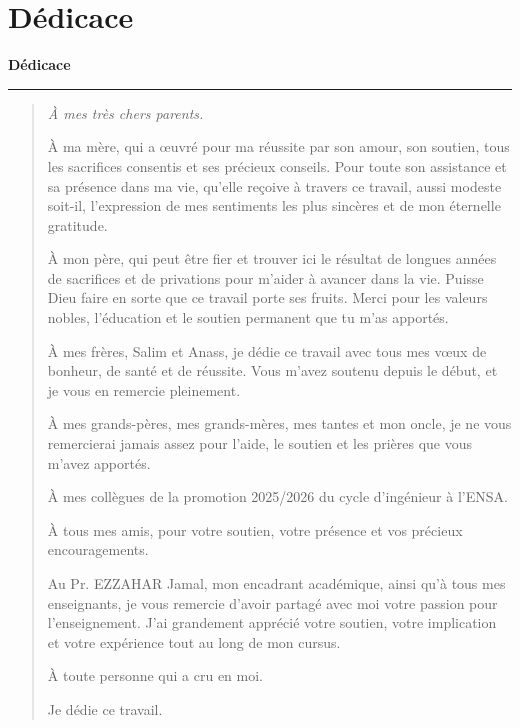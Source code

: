 \chapter*{Dédicace}

\begin{center}
\vspace*{0.5cm}
{\Large\bfseries Dédicace}\\[0.25cm]
{\color{softline}\rule{0.38\textwidth}{0.7pt}}
\end{center}

\vspace{0.35cm}

\begin{quote}
\small
\itshape
\setlength{\parskip}{0.42em}
\setlength{\baselineskip}{1.12\baselineskip}
À mes très chers parents.

À ma mère, qui a œuvré pour ma réussite par son amour, son soutien, tous les sacrifices consentis et ses précieux conseils. Pour toute son assistance et sa présence dans ma vie, qu'elle reçoive à travers ce travail, aussi modeste soit-il, l'expression de mes sentiments les plus sincères et de mon éternelle gratitude.

À mon père, qui peut être fier et trouver ici le résultat de longues années de sacrifices et de privations pour m'aider à avancer dans la vie. Puisse Dieu faire en sorte que ce travail porte ses fruits. Merci pour les valeurs nobles, l'éducation et le soutien permanent que tu m'as apportés.

À mes frères, Salim et Anass, je dédie ce travail avec tous mes vœux de bonheur, de santé et de réussite. Vous m'avez soutenu depuis le début, et je vous en remercie pleinement.

À mes grands-pères, mes grands-mères, mes tantes et mon oncle, je ne vous remercierai jamais assez pour l'aide, le soutien et les prières que vous m'avez apportés.

À mes collègues de la promotion 2025/2026 du cycle d'ingénieur à l'ENSA.

À tous mes amis, pour votre soutien, votre présence et vos précieux encouragements.

Au Pr. EZZAHAR Jamal, mon encadrant académique, ainsi qu'à tous mes enseignants, je vous remercie d'avoir partagé avec moi votre passion pour l'enseignement. J'ai grandement apprécié votre soutien, votre implication et votre expérience tout au long de mon cursus.

À toute personne qui a cru en moi.

Je dédie ce travail.
\end{quote}

\vspace{0.45cm}
\begin{flushright}
\textit{\NomEtudiant}
\end{flushright}

\clearpage
